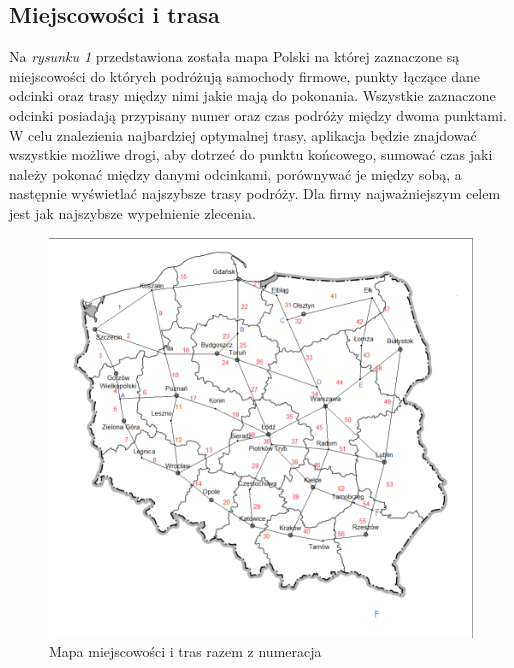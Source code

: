 \documentclass[11pt,a4paper]{mwart}
\begin{document}
\subsection{Miejscowości i trasa}
Na \textit{rysunku 1} przedstawiona została mapa Polski na której zaznaczone są miejscowości do których podróżują samochody firmowe, punkty łączące dane odcinki oraz trasy między nimi jakie mają do pokonania. Wszystkie zaznaczone odcinki posiadają przypisany numer oraz czas podróży między dwoma punktami. W celu znalezienia najbardziej optymalnej trasy, aplikacja będzie znajdować wszystkie możliwe drogi, aby dotrzeć do punktu końcowego, sumować czas jaki należy pokonać między danymi odcinkami, porównywać je między sobą, a następnie wyświetlać najszybsze trasy podróży. Dla firmy najważniejszym celem jest jak najszybsze wypełnienie zlecenia.
\begin{figure}[th]
\centering
\includegraphics[width=\textwidth]{mapa.png}
\caption{Mapa miejscowości i tras razem z numeracja}
\end{figure}
\end{document}
